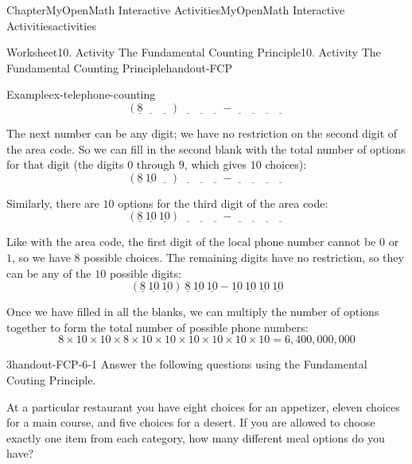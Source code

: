 \documentclass[oneside,10pt,]{book}
\begin{document}
\begin{chapterptx}{Chapter}{MyOpenMath Interactive Activities}{}{MyOpenMath Interactive Activities}{}{}{activities}
\begin{worksheet-section}{Worksheet}{10. Activity The Fundamental Counting Principle}{}{10. Activity The Fundamental Counting Principle}{}{}{handout-FCP}
\begin{example}{Example}{}{ex-telephone-counting}
\begin{equation*}
(\underline{8} \ \underline{\quad} \ \underline{\quad}) \ \underline{\quad} \ \underline{\quad} \ \underline{\quad} - \underline{\quad} \ \underline{\quad} \ \underline{\quad} \ \underline{\quad}
\end{equation*}
%
\par
The next number can be any digit; we have no restriction on the second digit of the area code. So we can fill in the second blank with the total number of options for that digit (the digits \(0\) through \(9\), which gives \(10\) choices):%
\begin{equation*}
(\underline{8} \ \underline{10} \ \underline{\quad}) \ \underline{\quad} \ \underline{\quad} \ \underline{\quad} - \underline{\quad} \ \underline{\quad} \ \underline{\quad} \ \underline{\quad}
\end{equation*}
%
\par
Similarly, there are \(10\) options for the third digit of the area code:%
\begin{equation*}
(\underline{8} \ \underline{10} \ \underline{10}) \ \underline{\quad} \ \underline{\quad} \ \underline{\quad} - \underline{\quad} \ \underline{\quad} \ \underline{\quad} \ \underline{\quad}
\end{equation*}
%
\par
Like with the area code, the first digit of the local phone number cannot be \(0\) or \(1\), so we have \(8\) possible choices. The remaining digits have no restriction, so they can be any of the \(10\) possible digits:%
\begin{equation*}
(\underline{8} \ \underline{10} \ \underline{10}) \ \underline{8} \ \underline{10} \ \underline{10} - \underline{10} \ \underline{10} \ \underline{10} \ \underline{10}
\end{equation*}
%
\par
Once we have filled in all the blanks, we can multiply the number of options together to form the total number of possible phone numbers:%
\begin{equation*}
8 \times 10 \times 10 \times 8 \times 10 \times 10 \times 10 \times 10 \times 10 \times 10 = 6,400,000,000
\end{equation*}
%
\end{example}
\clearpage
\begin{divisionexercise}{3}{}{}{handout-FCP-6-1}%
Answer the following questions using the Fundamental Couting Principle.%
\par
At a particular restaurant you have eight choices for an appetizer, eleven choices for a main course, and five choices for a desert. If you are allowed to choose exactly one item from each category, how many different meal options do you have?%

\end{divisionexercise}
\end{worksheet-section}
\end{chapterptx}
\end{document}
